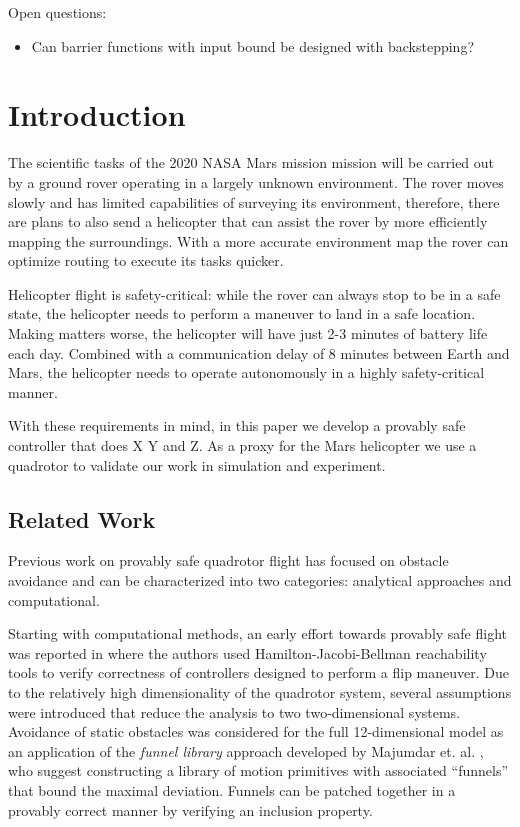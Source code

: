 \documentclass[conference]{IEEEtran}
\begin{document}
Open questions:
\begin{itemize}
  \item Can barrier functions with input bound be designed with backstepping?
\end{itemize}

\section{Introduction} \label{subsec:intro}

The scientific tasks of the 2020 NASA Mars mission mission will be carried out by a ground rover operating in a largely unknown environment. The rover moves slowly and has limited capabilities of surveying its environment, therefore, there are plans to also send a helicopter that can assist the rover by more efficiently mapping the surroundings. With a more accurate environment map the rover can optimize routing to execute its tasks quicker.

Helicopter flight is safety-critical: while the rover can always stop to be in a safe state, the helicopter needs to perform a maneuver to land in a safe location. Making matters worse, the helicopter will have just 2-3 minutes of battery life each day. Combined with a communication delay of 8 minutes between Earth and Mars, the helicopter needs to operate autonomously in a highly safety-critical manner.

With these requirements in mind, in this paper we develop a provably safe controller that does X Y and Z. As a proxy for the Mars helicopter we use a quadrotor to validate our work in simulation and experiment.   


\subsection{Related Work}

Previous work on provably safe quadrotor flight has focused on obstacle avoidance and can be characterized into two categories: analytical approaches and computational.

Starting with computational methods, an early effort towards provably safe flight was reported in \cite{Gillula2010} where the authors used Hamilton-Jacobi-Bellman reachability tools to verify correctness of controllers designed to perform a flip maneuver. Due to the relatively high dimensionality of the quadrotor system, several assumptions were introduced that reduce the analysis to two two-dimensional systems. Avoidance of static obstacles was considered for the full 12-dimensional model as an application of the \emph{funnel library} approach developed by Majumdar et. al. \cite{Majumdar2017}, who suggest constructing a library of motion primitives with associated ``funnels'' that bound the maximal deviation. Funnels can be patched together in a provably correct manner by verifying an inclusion property.
\end{document}
